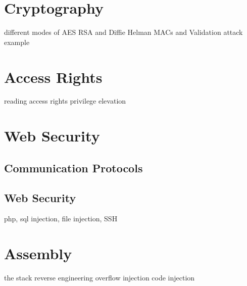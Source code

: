 \section{Cryptography}
different modes of AES
RSA and Diffie Helman
MACs and Validation
attack example
\section{Access Rights}
reading access rights
privilege elevation
\section{Web Security}
\subsection{Communication Protocols}
\subsection{Web Security}
php, sql injection, file injection, SSH
\section{Assembly}
the stack
reverse engineering
overflow injection
code injection